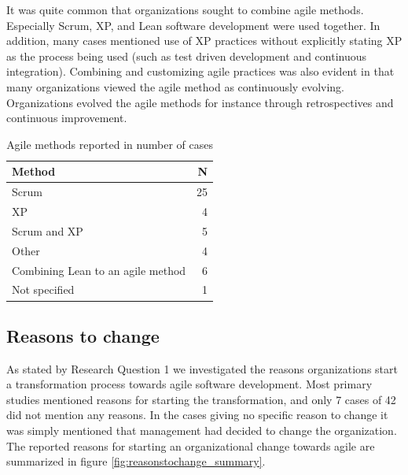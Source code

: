 It was quite common that organizations sought to combine agile methods.
Especially Scrum, XP, and Lean software development were used together. In
addition, many cases mentioned use of XP practices without explicitly stating XP
as the process being used (such as test driven development and continuous
integration). Combining and customizing agile practices was also evident in that
many organizations viewed the agile method as continuously evolving.
Organizations evolved the agile methods for instance through retrospectives and
continuous improvement.

\begin{table}[h]
    \centering
    \begin{tabular}{ l r }
        \toprule
        Method                             &  N  \\
        \midrule
        Scrum                              &  25 \\
        XP                                 &  4  \\
        Scrum and XP                       &  5  \\
        Other                              &  4  \\
        Combining Lean to an agile method  &  6  \\
        Not specified                      &  1  \\
        \bottomrule
    \end{tabular}
    \caption{Agile methods reported in number of cases}
    \label{table:agilemethods}
\end{table}


\clearpage

\subsection{Reasons to change}

As stated by Research Question 1 we investigated the reasons organizations start
a transformation process towards agile software development. Most primary
studies mentioned reasons for starting the transformation, and only 7 cases of
42 did not mention any reasons. In the cases giving no specific reason to change
it was simply mentioned that management had decided to change the organization.
The reported reasons for starting an organizational change towards agile are
summarized in figure \ref{fig:reasonstochange_summary}.



